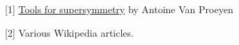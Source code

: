 \documentclass[10pt,letterpaper]{article}
\def\mysection #1#2{\medskip\pagebreak[1]\noindent\textbf{\large #1.\ #2}\smallskip}
\def\myparagraph #1{\textbf{#1}}
\begin{document}
%

\bigskip
\vfill
\setlength{\parindent}{0pt}



[1] \href{http://arxiv.org/abs/hep-th/9910030}{Tools for supersymmetry} by Antoine Van Proeyen

[2] Various Wikipedia articles.
\end{document}
